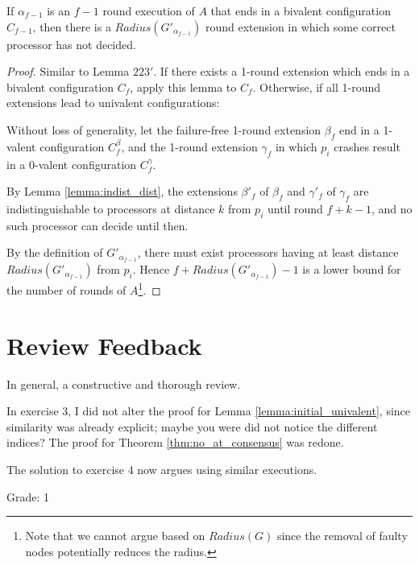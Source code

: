 \begin{lemma}
If $\alpha_{f-1}$ is an $f-1$ round execution of $A$ that ends in a bivalent
configuration $C_{f-1}$, then there is a $Radius(G'_{\alpha_{f-1}})$ round extension 
in which some correct processor has not decided.
\end{lemma}

\begin{proof}
Similar to Lemma $223'$.
If there exists a 1-round extension which ends in a bivalent configuration $C_f$,
apply this lemma to $C_f$. Otherwise, if all 1-round extensions lead to univalent
configurations:

Without loss of generality, let the failure-free 1-round extension $\beta_f$
end in a 1-valent configuration $C^\beta_f$, and the 1-round extension $\gamma_f$ in which
$p_i$ crashes result in a 0-valent configuration $C^\gamma_f$.

By Lemma \ref{lemma:indist_dist}, the extensions $\beta'_f$ of $\beta_f$ and 
$\gamma'_f$ of $\gamma_f$ are indistinguishable to processors at distance $k$
from $p_i$ until round $f+k-1$, and no such processor can decide
until then.

By the definition of $G'_{\alpha_{f-1}}$, there must exist processors having at 
least distance $Radius(G'_{\alpha_{f-1}})$ from $p_i$. 
Hence $f+Radius(G'_{\alpha_{f-1}})-1$ is a lower bound for the number
of rounds of $A$\footnote{Note that we cannot argue based on $Radius(G)$ since
the removal of faulty nodes potentially reduces the radius.}.
\end{proof}

\section{Review Feedback}

In general, a constructive and thorough review.

In exercise 3, I did not alter the proof for Lemma \ref{lemma:initial_univalent},
since similarity was already explicit; maybe you were did not notice the 
different indices? The proof for Theorem \ref{thm:no_at_consensus} was redone.

The solution to exercise 4 now argues using similar executions.

Grade: 1
